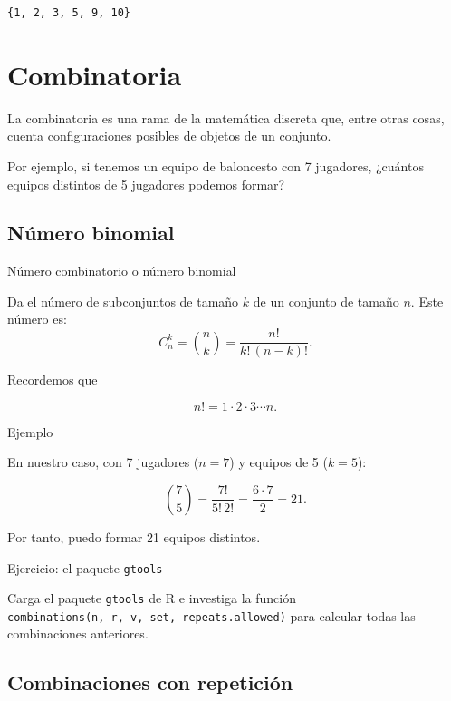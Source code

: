 \documentclass[
  letterpaper,
  DIV=11,
  numbers=noendperiod]{scrreprt}
\begin{document}
\begin{verbatim}
{1, 2, 3, 5, 9, 10}
\end{verbatim}

\section{Combinatoria}\label{combinatoria}

La combinatoria es una rama de la matemática discreta que, entre otras
cosas, cuenta configuraciones posibles de objetos de un conjunto.

Por ejemplo, si tenemos un equipo de baloncesto con 7 jugadores,
¿cuántos equipos distintos de 5 jugadores podemos formar?

\subsection{Número binomial}\label{nuxfamero-binomial}

\begin{Definicion}{Número combinatorio o número binomial}{}

Da el número de subconjuntos de tamaño \(k\) de un conjunto de tamaño
\(n\). Este número es: \[
C_n^k=\binom{n}{k} = \frac{n!}{k!\,(n-k)!}.
\]

Recordemos que

\[
n!=1\cdot 2\cdot 3\cdots n.
\]

\end{Definicion}

\begin{Ejemplo}{Ejemplo}{}

En nuestro caso, con 7 jugadores (\(n=7\)) y equipos de 5 (\(k=5\)):

\[
\binom{7}{5} = \frac{7!}{5!\,2!}
=\frac{6\cdot 7}{2}
=21.
\]

Por tanto, puedo formar 21 equipos distintos.

\end{Ejemplo}

\begin{Ejercicio}{Ejercicio: el paquete \texttt{gtools}}{}

Carga el paquete \texttt{gtools} de R e investiga la función
\texttt{combinations(n,\ r,\ v,\ set,\ repeats.allowed)} para calcular
todas las combinaciones anteriores.

\end{Ejercicio}

\subsection{Combinaciones con
repetición}\label{combinaciones-con-repeticiuxf3n}
\end{document}
